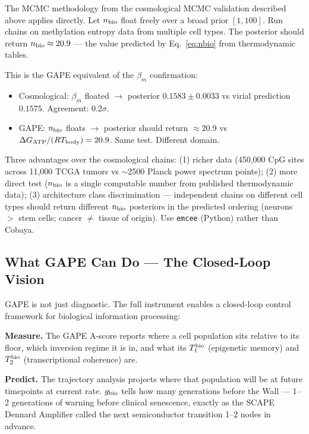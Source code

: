 \documentclass[12pt,a4paper]{article}
\begin{document}
The MCMC methodology from the cosmological MCMC validation described above applies directly.
Let $n_{\rm bio}$ float freely over a broad prior $[1, 100]$.
Run chains on methylation entropy data from multiple cell types.
The posterior should return $n_{\rm bio} \approx 20.9$ ---
the value predicted by Eq.~\eqref{eq:nbio} from thermodynamic tables.

This is the GAPE equivalent of the $\beta_m$ confirmation:
\begin{itemize}
\item Cosmological: $\beta_m$ floated $\to$ posterior $0.1583 \pm 0.0033$
  vs virial prediction $0.1575$. Agreement: $0.2\sigma$.
\item GAPE: $n_{\rm bio}$ floats $\to$ posterior should return $\approx 20.9$
  vs $\Delta G_{\rm ATP}/(RT_{\rm body}) = 20.9$. Same test. Different domain.
\end{itemize}

Three advantages over the cosmological chains: (1) richer data
(450,000 CpG sites across 11,000 TCGA tumors vs $\sim$2500 Planck
power spectrum points); (2) more direct test ($n_{\rm bio}$ is a single
computable number from published thermodynamic data);
(3) architecture class discrimination ---
independent chains on different cell types should return different
$n_{\rm bio}$ posteriors in the predicted ordering
(neurons $>$ stem cells; cancer $\neq$ tissue of origin).
Use \texttt{emcee} (Python) rather than Cobaya.

\subsection{What GAPE Can Do --- The Closed-Loop Vision}

GAPE is not just diagnostic. The full instrument enables a closed-loop
control framework for biological information processing:

\textbf{Measure.} The GAPE A-score reports where a cell population
sits relative to its floor, which inversion regime it is in,
and what its $T_1^{\rm bio}$ (epigenetic memory) and
$T_2^{\rm bio}$ (transcriptional coherence) are.

\textbf{Predict.} The trajectory analysis projects where that
population will be at future timepoints at current rate.
$g_{\rm bio}$ tells how many generations before the Wall ---
1--2 generations of warning before clinical senescence,
exactly as the SCAPE Dennard Amplifier called the next
semiconductor transition 1--2 nodes in advance.
\end{document}
